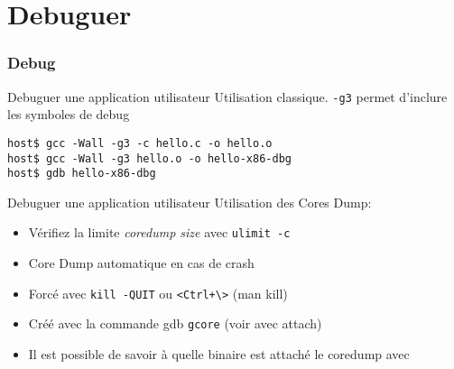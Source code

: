 %
%

\part{Debuguer}

\begin{frame}
  \partpage
\end{frame}

\begin{frame}
  \tableofcontents[currentpart]
\end{frame}

\section{Debug}

\begin{frame}[fragile=singleslide]{Debuguer une application utilisateur}
  Utilisation classique.  \verb+-g3+ permet d'inclure  les symboles de
  debug
  \begin{lstlisting}
host$ gcc -Wall -g3 -c hello.c -o hello.o
host$ gcc -Wall -g3 hello.o -o hello-x86-dbg
host$ gdb hello-x86-dbg
  \end{lstlisting}  
\end{frame}


\begin{frame}[fragile=singleslide]{Debuguer une application utilisateur}
  Utilisation des Cores Dump:
  \begin{itemize}
  \item Vérifiez la limite \emph{coredump size} avec \texttt{ulimit -c}
  \item Core Dump automatique en cas de crash
  \item Forcé avec \texttt{kill -QUIT} ou \verb|<Ctrl+\>| (man kill)
  \item Créé avec la commande gdb \texttt{gcore} (voir avec attach)
  \item  Il est possible  de savoir  à quelle  binaire est  attaché le
    coredump avec 
  \end{itemize}
\end{frame}

